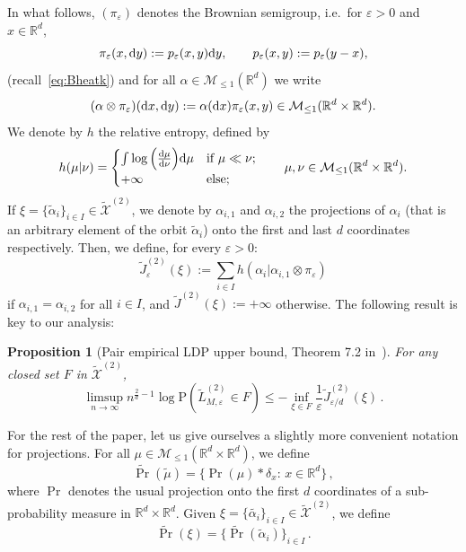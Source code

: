 \documentclass[a4paper,11pt]{amsart}
\numberwithin{equation}{section}
\newtheorem{proposition}[theorem]{Proposition}
\newcommand{\bbR}{{\ensuremath{\mathbb R}} }
\newcommand{\cM}{{\ensuremath{\mathcal M}} }
\newcommand{\cX}{{\ensuremath{\mathcal X}} }
\newcommand{\ga}{\alpha}
\newcommand{\gep}{\varepsilon}
\renewcommand{\tilde}{\widetilde}          %
\newcommand{\dd}{\text{\rm d}}             %
\newcommand{\R}{\mathbb{R}}
\newcommand\bP{\ensuremath{\mathrm{P}}}
\newcommand{\8}{\infty}
\newcommand{\beq}{\begin{equation}}
\newcommand{\eeq}{\end{equation}}
\begin{document}
\par In what follows, $(\pi_\gep)$ denotes the Brownian semigroup, i.e.\ for $\gep>0$ and $x\in\bbR^d$,
\beq
\pi_\gep(x,\dd y) := p_\gep(x,y)\dd y, \qquad p_\gep(x,y):=p_\gep(y-x),
\eeq
(recall~\eqref{eq:Bheatk}) and for all $\ga\in\cM_{\le 1}(\bbR^d)$ we write
\beq
(\ga \otimes \pi_\gep)(\dd x, \dd y):= \ga(\dd x)\pi_\gep(x,y) \in \cM_{\le 1}(\bbR^d \times \bbR^d).
\eeq
We denote by $h$ the relative entropy, defined by
\begin{equation}
h(\mu|\nu)= 
\begin{cases}
\int \log\Big(\frac{\dd \mu}{\dd \nu}\Big) \dd \mu & \textrm{if } \mu \ll \nu;\\
+\infty& \textrm{else;}
\end{cases}
\qquad \mu, \nu\in \cM_{\leq 1}(\bbR^d \times \bbR^d).
\end{equation}
If $\xi = \{\tilde \ga _i\}_{i\in I}\in \tilde\cX^{(2)}$, we denote by $\ga_{i,1}$ and $\ga_{i,2}$ the projections of $\ga_i$ (that is an arbitrary element of the orbit $\tilde \ga_i$) onto the first and last $d$ coordinates respectively. Then, we define, for every $\gep>0$:
\beq\label{eq:ratefct}
\tilde J_\gep^{(2)}(\xi) := \sum_{i\in I} h(\ga_i | \ga_{i,1} \otimes \pi_\gep)
\eeq
if $\ga_{i,1}=\ga_{i,2}$ for all $i\in I$, and $\tilde J^{(2)}(\xi) := +\infty$ otherwise.
The following result is key to our analysis:
%
\begin{proposition}[Pair empirical LDP upper bound, Theorem 7.2 in~\cite{EP23}]
\label{pr:LDPpair}
For any closed set $F$ in $\tilde\cX^{(2)}$,
\beq
\limsup_{n\to\infty}{n^{\frac2d -1}}\log \bP(\tilde{L}_{M,\gep}^{(2)}\in F )
\leq -\inf_{\xi\in F}\frac{1}{\gep} \tilde J^{(2)}_{ \gep/d} (\xi)\,.
\eeq
\end{proposition}
%
For the rest of the paper, let us give ourselves a slightly more convenient notation for projections. For all $\mu\in\cM_{\le 1}(\bbR^d\times \bbR^d)$, we define
\beq
\tilde\Pr(\tilde\mu)= \{\Pr(\mu)*\delta_x\colon\, x\in \R^d\}\,,
\eeq
where $\Pr$ denotes the usual projection onto the first $d$ coordinates of a sub-probability measure in $\R^d\times\R^d$. Given $\xi=\{\tilde{\alpha_i}\}_{i\in I}\in \tilde\cX^{(2)}$, we define 
\beq
\tilde\Pr(\xi)= \{\tilde\Pr(\tilde\alpha_{i})\}_{i\in I}\,.
\eeq
\end{document}
